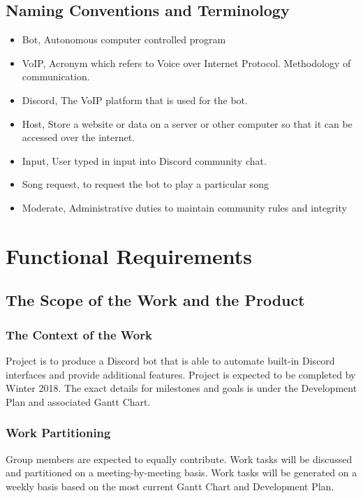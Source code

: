 \documentclass[12pt, titlepage]{article}
\begin{document}
\subsection{Naming Conventions and Terminology}
\begin{itemize}
\item Bot, Autonomous computer controlled program 
\item VoIP, Acronym which refers to Voice over Internet Protocol. Methodology of communication. 
\item Discord, The VoIP platform that is used for the bot.
\item Host, Store a website or data on a server or other computer so that it can be accessed over the internet.
\item Input, User typed in input into Discord community chat.
\item Song request, to request the bot to play a particular song
\item Moderate, Administrative duties to maintain community rules and integrity
\end{itemize}

\section{Functional Requirements}

\subsection{The Scope of the Work and the Product}

\subsubsection{The Context of the Work}
Project is to produce a Discord bot that is able to automate built-in Discord interfaces and provide additional features. Project is expected to be completed by Winter 2018. The exact details for milestones and goals is under the Development Plan and associated Gantt Chart. 

\subsubsection{Work Partitioning}
Group members are expected to equally contribute. Work tasks will be discussed and partitioned on a meeting-by-meeting basis. Work tasks will be generated on a weekly basis based on the most current Gantt Chart and Development Plan.
\end{document}
